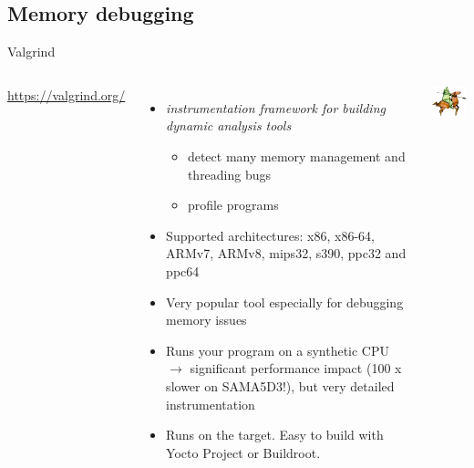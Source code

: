 \subsection{Memory debugging}

\begin{frame}{Valgrind}
  \begin{columns}[T]
    \url{https://valgrind.org/}
    \begin{itemize}
    \item {\em instrumentation framework for building dynamic analysis tools}
      \begin{itemize}
      \item detect many memory management and threading bugs
      \item profile programs
      \end{itemize}
    \item Supported architectures: x86, x86-64, ARMv7, ARMv8, mips32,
      s390, ppc32 and ppc64
    \item Very popular tool especially for debugging memory issues
    \item Runs your program on a synthetic CPU $\rightarrow$
      significant performance impact (100 x slower on SAMA5D3!),
      but very detailed instrumentation
    \item Runs on the target. Easy to build with Yocto Project
	  or Buildroot.
    \end{itemize}
    \includegraphics[width=\textwidth]{slides/linux-app-memory/valgrind1.png}
  \end{columns}
\end{frame}

